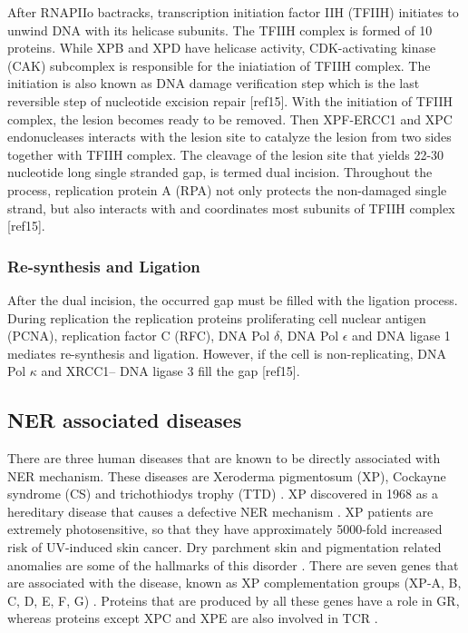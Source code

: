 After RNAPIIo bactracks, transcription initiation factor IIH (TFIIH) initiates to unwind DNA with its helicase subunits. The TFIIH complex is formed of 10 proteins. While XPB and XPD have helicase activity, CDK-activating kinase (CAK)  subcomplex is responsible for the iniatiation of TFIIH complex. The initiation is also known as DNA damage verification step which is the last reversible step of nucleotide excision repair [ref15]. With the initiation of TFIIH complex, the lesion becomes ready to be removed. Then XPF-ERCC1 and XPC endonucleases interacts with the lesion site to catalyze the lesion from two sides together with TFIIH complex. The cleavage of the lesion site that yields 22-30 nucleotide long single stranded gap, is termed dual incision. Throughout the process, replication protein A (RPA) not only protects the non-damaged single strand, but also interacts with and coordinates most subunits of TFIIH complex [ref15].

\subsubsection{Re-synthesis and Ligation}

After the dual incision, the occurred gap must be filled with the ligation process. During replication the replication proteins proliferating cell nuclear antigen (PCNA), replication factor C (RFC), DNA Pol $\delta$, DNA Pol $\epsilon$ and DNA ligase 1 mediates re-synthesis and ligation. However, if the cell is non-replicating, DNA Pol $\kappa$ and XRCC1– DNA ligase 3 fill the gap [ref15].

\subsection{NER associated diseases}

There are three human diseases that are known to be directly associated with NER mechanism. These diseases are Xeroderma pigmentosum (XP), Cockayne syndrome (CS) and trichothiodys trophy (TTD) \citep{de2000nucleotide,lehmann2003dna}. 
XP discovered in 1968 as a hereditary disease that causes a defective NER mechanism \citep{cleaver1968defective}. XP patients are extremely photosensitive, so that they have approximately 5000-fold increased risk of UV-induced skin cancer. Dry parchment skin and pigmentation related anomalies are some of the hallmarks of this disorder \citep{de2000nucleotide}.  There are seven genes that are associated with the disease, known as XP complementation groups (XP-A, B, C, D, E, F, G) \citep{cleaver1975xeroderma}. Proteins that are produced by all these genes have a role in GR, whereas proteins except XPC and XPE are also involved in TCR \citep{van1995transcription}.  

